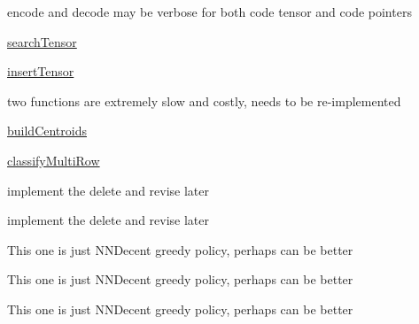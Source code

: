 \begin{DoxyRefList}
encode and decode may be verbose for both code tensor and code pointers
\begin{DoxyItemize}
\item \mbox{\hyperlink{classCANDY_1_1PQIndex_a497ffde8db74ea3fb13efe62146dd154}{search\+Tensor}}
\item \mbox{\hyperlink{classCANDY_1_1PQIndex_a44bac43c454b1b28151cb696ab48acbd}{insert\+Tensor}}  
\end{DoxyItemize}
\item[Class \mbox{\hyperlink{classCANDY_1_1SimpleStreamClustering}{CANDY\+::Simple\+Stream\+Clustering}} ]\label{todo__todo000006}%
%
two functions are extremely slow and costly, needs to be re-\/implemented
\begin{DoxyItemize}
\item \mbox{\hyperlink{classCANDY_1_1SimpleStreamClustering_a37a18894af9925a11bad920de3c3f53c}{build\+Centroids}}
\item \mbox{\hyperlink{classCANDY_1_1SimpleStreamClustering_ad7776c54cc5804ab6edc870e48cf07da}{classify\+Multi\+Row}}  
\end{DoxyItemize}
\item[Class \mbox{\hyperlink{classCANDY_1_1YinYangGraphIndex}{CANDY\+::Yin\+Yang\+Graph\+Index}} ]\label{todo__todo000012}%
%
implement the delete and revise later  
\item[Class \mbox{\hyperlink{classCANDY_1_1YinYangGraphSimpleIndex}{CANDY\+::Yin\+Yang\+Graph\+Simple\+Index}} ]\label{todo__todo000013}%
%
implement the delete and revise later  
\item[Member \mbox{\hyperlink{classCANDY_1_1YinYangVertex_a08b3ed71f86ea8c0a48b16ef0821fd17}{CANDY\+::Yin\+Yang\+Vertex\+::greedy\+Search\+For\+KNearest\+Tensor}} (torch\+::\+Tensor \&src, Yin\+Yang\+Vertex\+Ptr entry\+Point, int64\+\_\+t k, float\+Distance\+Function\+\_\+t df=Yin\+Yang\+Graph\+\_\+\+Distance\+Functions\+::\+L2\+Distance)]\label{todo__todo000009}%
%
This one is just NNDecent greedy policy, perhaps can be better  
\item[Member \mbox{\hyperlink{classCANDY_1_1YinYangVertex_a724d2ff950f050b0bc1a4d02b2152794}{CANDY\+::Yin\+Yang\+Vertex\+::greedy\+Search\+For\+KNearest\+Vertex}} (Yin\+Yang\+Vertex\+Ptr src, Yin\+Yang\+Vertex\+Ptr entry\+Point, int64\+\_\+t k, bool ignore\+Yin, bool force\+The\+Same\+Level, float\+Distance\+Function\+\_\+t df=Yin\+Yang\+Graph\+\_\+\+Distance\+Functions\+::\+L2\+Distance)]\label{todo__todo000010}%
%
This one is just NNDecent greedy policy, perhaps can be better  
\item[Member \mbox{\hyperlink{classCANDY_1_1YinYangVertex_a3e11e6d843ce762a8803bd3d85586740}{CANDY\+::Yin\+Yang\+Vertex\+::greedy\+Search\+For\+KNearest\+Vertex}} (torch\+::\+Tensor \&src, Yin\+Yang\+Vertex\+Ptr entry\+Point, int64\+\_\+t k, bool ignore\+Yin, bool force\+The\+Same\+Level, float\+Distance\+Function\+\_\+t df=Yin\+Yang\+Graph\+\_\+\+Distance\+Functions\+::\+L2\+Distance)]\label{todo__todo000011}%
%
This one is just NNDecent greedy policy, perhaps can be better 
\end{DoxyRefList}